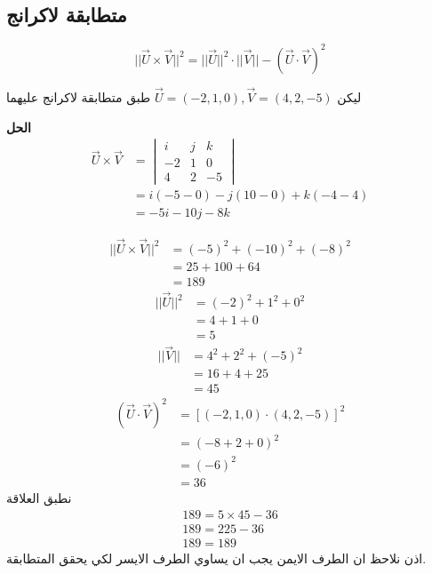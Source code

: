\subsection*{متطابقة لاكرانج}
\[
||\vec{U}\times\vec{V}||^2 = ||\vec{U}||^2 \cdot ||\vec{V}|| - (\vec{U}\cdot\vec{V})^2
\]

\begin{example}
	ليكن
	$\vec{U}=(-2, 1,0) , \vec{V}=(4,2,-5)$
	طبق متطابقة لاكرانج عليهما
\end{example}
\noindent
\textbf{الحل}
\begin{align*}
		\vec{U}\times\vec{V} & = 
	\begin{vmatrix}
		i & j & k\\
		-2 & 1 & 0\\
		4 & 2 & -5
	\end{vmatrix}\\
	&= i(-5-0) - j(10-0) + k(-4-4)\\
	&= -5i -10j -8k
\end{align*}

\begin{align*}
	||\vec{U}\times\vec{V}||^2 &= (-5)^2 + (-10)^2 + (-8)^2\\
	&= 25 + 100 + 64 \\
	&= 189
\end{align*}
\begin{align*}
	||\vec{U}||^2 &= (-2)^2 + 1^2 + 0^2\\
	&= 4+1+0\\
	&= 5
\end{align*}
\begin{align*}
	||\vec{V}|| &= 4^2 + 2^2 + (-5)^2\\
	&= 16 + 4 + 25\\
	&= 45
\end{align*}
\begin{align*}
	(\vec{U}\cdot\vec{V})^2 &= [(-2,1,0)\cdot(4,2,-5)]^2\\
	&= (-8+2+0)^2\\
	&= (-6)^2\\
	&= 36
\end{align*}
نطبق العلاقة 
\begin{gather*}
	189 = 5\times 45 - 36\\
	189 = 225 - 36\\
	 189 = 189
\end{gather*}
اذن نلاحظ ان الطرف الايمن يجب ان يساوي الطرف الايسر لكي يحقق المتطابقة.


